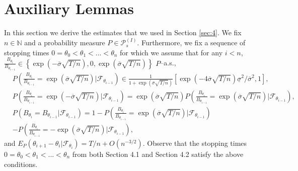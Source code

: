 \documentclass{amsart}
\numberwithin{equation}{section}
\begin{document}
\section{Auxiliary Lemmas}\label{sec:5}\setcounter{equation}{0}
In this section we derive the estimates that we used in Section \ref{sec:4}.
We fix $n\in\mathbb N$ and a probability measure $P\in \mathcal P^{(I)}_s$. Furthermore,
we fix a sequence of stopping times
$0=\theta_0<\theta_1<...<\theta_n$ for which we assume that for any $i<n$,
$
\frac{B_{\theta_i}}{B_{\theta_{i-1}}}\in \left
\{\exp(-\overline{\sigma}\sqrt{T/n}),0,\exp(\overline{\sigma}\sqrt{T/n})
\right\}$ $P$--a.s.,
\begin{eqnarray*}
&P\left(\frac{B_{\theta_i}}{B_{\theta_{i-1}}}=\exp(\overline{\sigma}\sqrt {T/n})|\mathcal F_{\theta_{i-1}}\right)
\in \frac{1}{1+\exp(\overline{\sigma}\sqrt{T/n})}\left[\exp\left(-4\overline{\sigma}\sqrt{T/n}\right)\underline{\sigma}^2/\overline{\sigma}^2,1\right],\\
& P\left(\frac{B_{\theta_i}}{B_{\theta_{i-1}}}=\exp(-\overline{\sigma}\sqrt{T/n})|\mathcal F_{\theta_{i-1}}\right)=\exp(\overline{\sigma}\sqrt{T/n})
P\left(\frac{ B_{\theta_i}}{ B_{\theta_{i-1}}}=\exp(\overline{\sigma}\sqrt {T/n})|\mathcal F_{\theta_{i-1}}\right)\label{4.2},\\
& P\left({B_{\theta_i}}={ B_{\theta_{i-1}}}|\mathcal F_{\theta_{i-1}}\right)=1-
P\left(\frac{B_{\theta_i}}{B_{\theta_{i-1}}}=\exp(\overline{\sigma}\sqrt {T/n})|\mathcal F_{\theta_{i-1}}\right)\label{4.3}\\
&- P\left(\frac{B_{\theta_i}}{B_{\theta_{i-1}}}=-\exp(\overline{\sigma}\sqrt {T/n})|\mathcal F_{\theta_{i-1}}\right),\nonumber
\end{eqnarray*}
and
$E_P(\theta_{i+1}-\theta_i|\mathcal F_{\theta_i})=T/n+O(n^{-3/2})$.
Observe that the stopping times $0=\theta_0<\theta_1<...<\theta_n$
from both Section 4.1 and Section 4.2 satisfy the above conditions.
\end{document}
